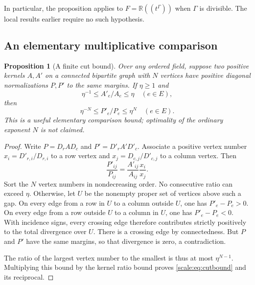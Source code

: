 \documentclass[11pt,a4paper]{article}
\numberwithin{equation}{section}
\newtheorem{proposition}[theorem]{Proposition}
\theoremstyle{definition}
\newcommand{\R}{\mathbb R}
\begin{document}
In particular, the proposition applies to $F=\R((t^\Gamma))$ when
$\Gamma$ is divisible. The local results earlier require no such
hypothesis.

\subsection{An elementary multiplicative comparison}
\begin{proposition}[A finite cut bound]\label{scale:prop:cutbound}
Over any ordered field, suppose two positive kernels $A,A'$ on a
connected bipartite graph with $N$ vertices have positive diagonal
normalizations $P,P'$ to the same margins. If $\eta\geq1$ and
\[
 \eta^{-1}\leq A'_e/A_e\leq\eta\quad(e\in E),
\]
then
\begin{equation}\label{scale:eq:cutbound}
 \eta^{-N}\leq P'_e/P_e\leq\eta^N\quad(e\in E).
\end{equation}
This is a useful elementary comparison bound; optimality of the
ordinary exponent $N$ is not claimed.
\end{proposition}
\begin{proof}
Write $P=D_rAD_c$ and $P'=D'_rA'D'_c$.
Associate a positive vertex number $x_i=D'_{r,i}/D_{r,i}$ to a row
vertex and $x_j=D_{c,j}/D'_{c,j}$ to a column vertex. Then
\[
 \frac{P'_{ij}}{P_{ij}}=
       \frac{A'_{ij}}{A_{ij}}\frac{x_i}{x_j}.
\]
Sort the $N$ vertex numbers in nondecreasing order. No consecutive
ratio can exceed $\eta$. Otherwise, let $U$ be the nonempty proper
set of vertices above such a gap. On every edge from a row in $U$
to a column outside $U$, one has $P'_e-P_e>0$. On every edge
from a row outside $U$ to a column in $U$, one has $P'_e-P_e<0$.
With incidence signs, every crossing edge therefore contributes
strictly positively to the total divergence over $U$. There is a
crossing edge by connectedness. But $P$ and $P'$ have the same
margins, so that divergence is zero, a contradiction.

The ratio of the largest vertex number to the smallest is thus at
most $\eta^{N-1}$. Multiplying this bound by the kernel ratio bound
proves \eqref{scale:eq:cutbound} and its reciprocal.
\end{proof}
\end{document}
